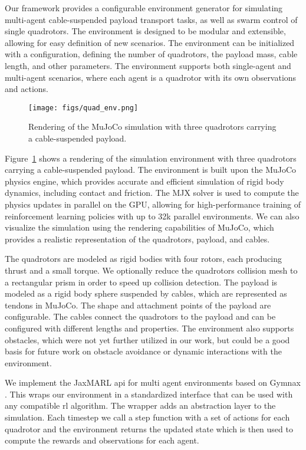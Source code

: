 Our framework provides a configurable environment generator for simulating multi-agent cable-suspended payload transport tasks, as well as swarm control of single quadrotors. The environment is designed to be modular and extensible, allowing for easy definition of new scenarios. The environment can be initialized with a configuration, defining the number of quadrotors, the payload mass, cable length, and other parameters. The environment supports both single-agent and multi-agent scenarios, where each agent is a quadrotor with its own observations and actions.
\begin{figure}
\centering
\texttt{[image: figs/quad\_env.png]}
\caption[Simulation Environment]{Rendering of the MuJoCo simulation with three quadrotors carrying a cable-suspended payload.}
\label{fig:crazyflie_env}
\end{figure}

Figure~\ref{fig:crazyflie_env} shows a rendering of the simulation environment with three quadrotors carrying a cable-suspended payload. The environment is built upon the MuJoCo physics engine, which provides accurate and efficient simulation of rigid body dynamics, including contact and friction. The MJX solver is used to compute the physics updates in parallel on the GPU, allowing for high-performance training of reinforcement learning policies with up to 32k parallel environments. We can also visualize the simulation using the rendering capabilities of MuJoCo, which provides a realistic representation of the quadrotors, payload, and cables.

The quadrotors are modeled as rigid bodies with four rotors, each producing thrust and a small torque. We optionally reduce the quadrotors collision mesh to a rectangular prism in order to speed up collision detection. The payload is modeled as a rigid body sphere suspended by cables, which are represented as tendons in MuJoCo. The shape and attachment points of the payload are configurable. The cables connect the quadrotors to the payload and can be configured with different lengths and properties. The environment also supports obstacles, which were not yet further utilized in our work, but could be a good basis for future work on obstacle avoidance or dynamic interactions with the environment.

We implement the JaxMARL api for multi agent environments based on Gymnax \autocite{gymnax2022github}. This wraps our environment in a standardized interface that can be used with any compatible \gls{rl} algorithm. The wrapper adds an abstraction layer to the simulation. Each timestep we call a step function with a set of actions for each quadrotor and the environment returns the updated state which is then used to compute the rewards and observations for each agent.

